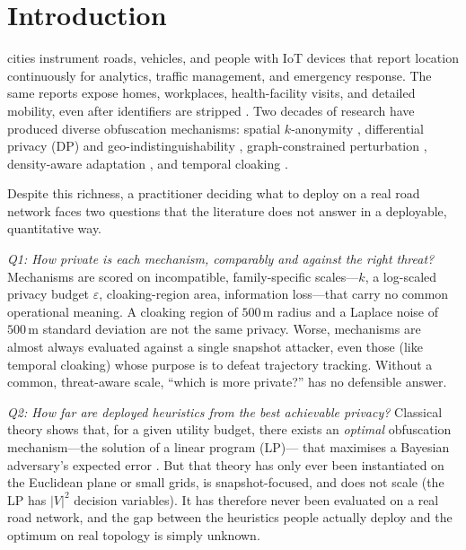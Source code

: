 \documentclass[10pt,journal,compsoc]{IEEEtran}
\begin{document}
\section{Introduction}
\label{sec:intro}
 cities instrument roads, vehicles, and people with IoT
devices that report location continuously for analytics, traffic management, and
emergency response. The same reports expose homes, workplaces, health-facility
visits, and detailed mobility, even after identifiers are stripped
\cite{sweeney2002,gruteser2003}. Two decades of research have produced diverse
obfuscation mechanisms: spatial $k$-anonymity \cite{sweeney2002,gruteser2003,
mokbel2006}, differential privacy (DP) and geo-indistinguishability
\cite{dwork2006,andres2013}, graph-constrained perturbation \cite{bordenabe2014},
density-aware adaptation \cite{niu2014}, and temporal cloaking \cite{gruteser2003}.

Despite this richness, a practitioner deciding what to deploy on a real road
network faces two questions that the literature does not answer in a deployable,
quantitative way.

\emph{Q1: How private is each mechanism, comparably and against the right
threat?} Mechanisms are scored on incompatible, family-specific scales---$k$, a
log-scaled privacy budget $\varepsilon$, cloaking-region area, information
loss---that carry no common operational meaning. A cloaking region of $500$\,m
radius and a Laplace noise of $500$\,m standard deviation are not the same
privacy. Worse, mechanisms are almost always evaluated against a single snapshot
attacker, even those (like temporal cloaking) whose purpose is to defeat
trajectory tracking. Without a common, threat-aware scale, ``which is more
private?'' has no defensible answer.

\emph{Q2: How far are deployed heuristics from the best achievable privacy?}
Classical theory shows that, for a given utility budget, there exists an
\emph{optimal} obfuscation mechanism---the solution of a linear program (LP)---
that maximises a Bayesian adversary's expected error \cite{shokri2012,
shokri2015pets,bordenabe2014}. But that theory has only ever been instantiated on
the Euclidean plane or small grids, is snapshot-focused, and does not scale (the
LP has $|V|^2$ decision variables). It has therefore never been evaluated on a
real road network, and the gap between the heuristics people actually deploy and
the optimum on real topology is simply unknown.
\end{document}
